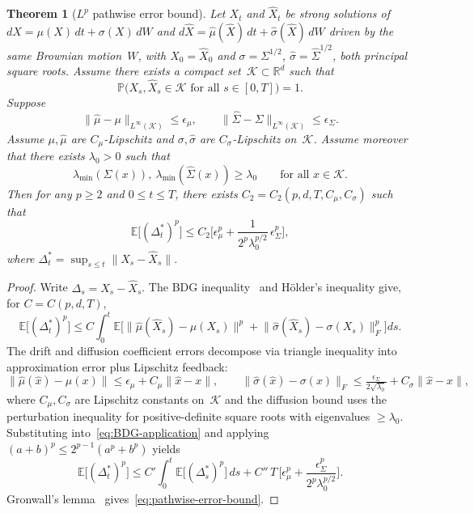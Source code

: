 \documentclass[11pt]{article}
\newcommand{\E}{\mathbb{E}}
\newcommand{\Prob}{\mathbb{P}}
\newcommand{\cK}{\mathcal{K}}
\newcommand{\Rd}{\mathbb{R}^d}
\newcommand{\norm}[1]{\lVert#1\rVert}
\newtheorem{thm}{Theorem}[section]
\begin{document}
\begin{thm}[$L^p$ pathwise error bound]\label{thm:pathwise-error}
Let $X_t$ and $\hat X_t$ be strong solutions of
$dX=\mu(X)\,dt+\sigma(X)\,dW$ and
$d\hat X=\hat\mu(\hat X)\,dt+\hat\sigma(\hat X)\,dW$
driven by the same Brownian motion~$W$,
with $X_0=\hat X_0$ and
$\sigma=\Sigma^{1/2}$,
$\hat\sigma=\hat\Sigma^{1/2}$, both principal square roots.
Assume there exists a compact set~$\cK\subset\Rd$ such that
\[
  \Prob\bigl(X_s,\hat X_s\in\cK \text{ for all } s\in[0,T]\bigr)=1.
\]
Suppose
\[
  \norm{\hat\mu-\mu}_{L^\infty(\cK)}\le\epsilon_\mu,
  \qquad
  \norm{\hat\Sigma-\Sigma}_{L^\infty(\cK)}\le\epsilon_\Sigma.
\]
Assume $\mu,\hat\mu$ are $C_\mu$-Lipschitz and
$\sigma,\hat\sigma$ are $C_\sigma$-Lipschitz on~$\cK$.
Assume moreover that there exists $\lambda_0>0$ such that
\[
  \lambda_{\min}(\Sigma(x)),\ \lambda_{\min}(\hat\Sigma(x))
  \ge \lambda_0
  \qquad\text{for all } x\in\cK.
\]
Then for any $p\ge 2$ and $0\le t\le T$, there exists
$C_2=C_2(p,d,T,C_\mu,C_\sigma)$ such that
\begin{equation}\label{eq:pathwise-error-bound}
  \E\big[(\Delta_t^*)^p\big]
  \le C_2\bigg[\epsilon_\mu^p
    + \frac{1}{2^p\lambda_0^{p/2}}\,\epsilon_\Sigma^p\bigg],
\end{equation}
where $\Delta_t^*=\sup_{s\le t}\norm{X_s-\hat X_s}$.
\end{thm}

\begin{proof}
Write $\Delta_s = X_s - \hat X_s$.
The BDG inequality~\cite{RogersWilliams2000} and
H\"{o}lder's inequality give, for $C=C(p,d,T)$,
\begin{equation}\label{eq:BDG-application}
  \E\big[(\Delta_t^*)^p\big]
  \le C\int_0^t
    \E\Big[\norm{\hat\mu(\hat X_s)-\mu(X_s)}^p
        +\norm{\hat\sigma(\hat X_s)-\sigma(X_s)}_F^p\Big]ds.
\end{equation}
The drift and diffusion coefficient errors decompose via triangle
inequality into approximation error plus Lipschitz feedback:
\[
  \norm{\hat\mu(\hat x)-\mu(x)}
  \le \epsilon_\mu + C_\mu\norm{\hat x - x},
  \qquad
  \norm{\hat\sigma(\hat x)-\sigma(x)}_F
  \le \tfrac{\epsilon_\Sigma}{2\sqrt{\lambda_0}}
    + C_\sigma\norm{\hat x - x},
\]
where $C_\mu,C_\sigma$ are Lipschitz constants on~$\cK$ and the
diffusion bound uses the perturbation inequality for
positive-definite square roots with eigenvalues $\ge\lambda_0$.
Substituting into~\eqref{eq:BDG-application} and applying
$(a+b)^p\le 2^{p-1}(a^p+b^p)$ yields
\[
  \E\big[(\Delta_t^*)^p\big]
  \le C'\int_0^t \E\big[(\Delta_s^*)^p\big]\,ds
    + C''\,T\,\bigg[\epsilon_\mu^p
    + \frac{\epsilon_\Sigma^p}{2^p\lambda_0^{p/2}}\bigg].
\]
Gronwall's lemma~\cite[Lemma~11.11]{RogersWilliams2000}
gives~\eqref{eq:pathwise-error-bound}.
\end{proof}
\end{document}
